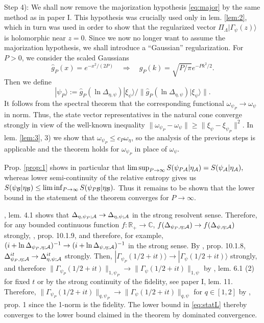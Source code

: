 \documentclass[english,a4paper,12pt]{article}
\def\cA{{\mathfrak A}}
\def\cB{{\mathfrak B}}
\newcommand{\ca}[1]{{\cal #1}}
\newcommand{\ben}{\begin{equation}}
\newcommand{\een}{\end{equation}}
\def\cA{{\ca A}}
\def\cB{{\ca B}}
\renewcommand{\log}{\operatorname{ln}}
\newcommand{\RR}{\mathbb{R}}
\newcommand{\CC}{\mathbb{C}}
\begin{document}
Step 4):
We shall now remove the majorization hypothesis \eqref{eq:major} by the same method as in paper I. 
This hypothesis was crucially used only in lem. \ref{lem:2}, which in turn was used in order to show that the regularized 
vector $\Pi_\Lambda|\Gamma_\psi(z)\rangle$ is holomorphic near $z=0$. Since we now no longer want to assume 
the majorization hypothesis, we shall introduce a ``Gaussian'' regularization. For $P>0$, we consider the scaled Gaussians 
\ben
\hat g_P(x) = e^{-x^2/(2P)}  \quad \Longrightarrow \quad g_P(k) = \sqrt{P/\pi} e^{-Pk^2/2} . 
\een
Then we define
\ben
\label{eq:psiPdef}
|\psi_P\rangle := \hat g_P(\log \Delta_{\eta,\psi}) |\xi_\psi \rangle/\|  \hat g_P(\log \Delta_{\eta,\psi}) |\xi_\psi \rangle \|. 
\een
It follows from the spectral theorem that the corresponding functional $\omega_{\psi_P} \to \omega_\psi$ in norm. 
Thus, the state vector representatives in the natural cone converge strongly in view of the well-known inequality
$\|\omega_{\psi_P} -  \omega_\psi\| \ge \| \xi_\psi -\xi_{\psi_P}\|^2$.
In lem. \ref{lem:3}, 3) we show that $\omega_{\psi_P} \le c_P \omega_\eta$, so the analysis of the previous steps is applicable and the 
theorem holds for $\omega_{\psi_P}$ in place of $\omega_\psi$. 

Prop. \ref{prop:1} shows   in particular that 
$
\limsup_{P \to \infty} S(\psi_{P\cA} | \eta_{\cA}) = S( \psi_{\cA} | \eta_{\cA}), 
$
whereas lower semi-continuity of the relative entropy \cite{Araki2} gives us
$
S(\psi_\cB | \eta_\cB) \le \liminf_{P \to \infty} S(\psi_{P\cB} | \eta_{\cB}).
$
Thus it remains to be shown that the lower bound in the statement of the theorem converges for $P \to \infty$.

\cite{Araki2}, lem. 4.1 shows  that $\Delta_{\eta,\psi_P;\cA} \to \Delta_{\eta,\psi;\cA}$ in the 
strong resolvent sense. Therefore, for any bounded continuous function $f: \RR_+ \to \CC$, $f(\Delta_{\psi_P,\eta;\cA}) \to f(\Delta_{\psi,\eta;\cA})$ strongly, \cite{specth}, prop. 10.1.9, and therefore, for example, $(i+\log \Delta_{\psi_P,\eta; \cA})^{-1} \to (i+\log \Delta_{\psi,\eta; \cA})^{-1}$
in the strong sense. By \cite{specth}, prop. 10.1.8, $\Delta_{\psi_P,\eta; \cA}^{it} \to \Delta_{\eta,\psi;\cA}^{it}$
strongly. Then, $|\Gamma_{\psi_P}(1/2+it)\rangle \to |\Gamma_{\psi}(1/2+it)\rangle$ strongly, and therefore 
$\| \Gamma_{\psi_P}(1/2+it)\|_{1,\psi_P} \to \| \Gamma_{\psi}(1/2+it)\|_{1,\psi}$ by \cite{AM}, lem. 6.1 (2) for fixed $t$ or by the strong continuity of the fidelity, see paper I, lem. 11. Therefore,
$\| \Gamma_{\psi_P}(1/2+it)\|_{q,\psi_P} \to \| \Gamma_{\psi}(1/2+it)\|_{q,\psi}$ for $q \in [1,2]$ by \cite{Hollands2}, prop. 1 since the 1-norm is the 
fidelity. The lower bound in \eqref{eq:statL} thereby converges to the lower bound claimed in the theorem by dominated convergence. 
\end{document}
